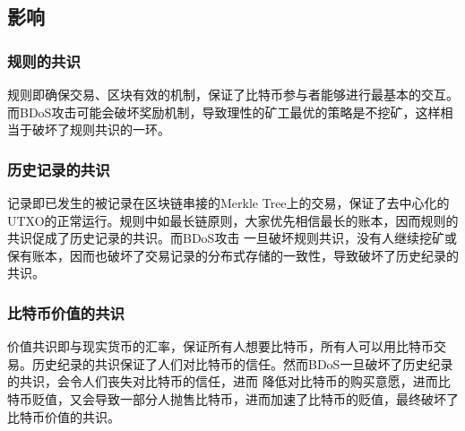 \documentclass[UTF8,12pt]{article}
\begin{document}
\subsection{影响}
\subsubsection{规则的共识}
规则即确保交易、区块有效的机制，保证了比特币参与者能够进行最基本的交互。而BDoS攻击可能会破坏奖励机制，导致理性的矿工最优的策略是不挖矿，这样相当于破坏了规则共识的一环。
\subsubsection{历史记录的共识}
记录即已发生的被记录在区块链串接的Merkle Tree上的交易，保证了去中心化的UTXO的正常运行。规则中如最长链原则，大家优先相信最长的账本，因而规则的共识促成了历史记录的共识。而BDoS攻击
一旦破坏规则共识，没有人继续挖矿或保有账本，因而也破坏了交易记录的分布式存储的一致性，导致破坏了历史纪录的共识。
\subsubsection{比特币价值的共识}
价值共识即与现实货币的汇率，保证所有人想要比特币，所有人可以用比特币交易。历史纪录的共识保证了人们对比特币的信任。然而BDoS一旦破坏了历史纪录的共识，会令人们丧失对比特币的信任，进而
降低对比特币的购买意愿，进而比特币贬值，又会导致一部分人抛售比特币，进而加速了比特币的贬值，最终破坏了比特币价值的共识。
\end{document}
